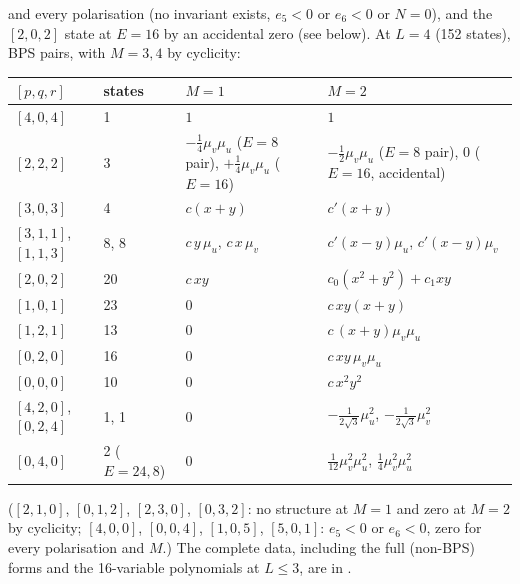 and every polarisation (no invariant exists, $e_5<0$ or $e_6<0$ or $N=0$), and the $[2,0,2]$ state at $E=16$ by an accidental zero (see below). At $L=4$ (152 states), BPS pairs, with $M=3,4$ by cyclicity:
\begin{center}\small
\begin{tabular}{@{}lp{1.2cm}p{4.6cm}p{5.4cm}@{}}
\toprule
$[p,q,r]$ & states & $M=1$ & $M=2$\\
\midrule
$[4,0,4]$ & 1 & $1$ & $1$\\
$[2,2,2]$ & 3 & $-\tfrac14\mu_v\mu_u$ ($E=8$ pair), $+\tfrac14\mu_v\mu_u$ ($E=16$) & $-\tfrac12\mu_v\mu_u$ ($E=8$ pair), $0$ ($E=16$, accidental)\\
$[3,0,3]$ & 4 & $c(x+y)$ & $c'(x+y)$\\
$[3,1,1]$, $[1,1,3]$ & 8, 8 & $c\,y\,\mu_u$, $c\,x\,\mu_v$ & $c'(x-y)\mu_u$, $c'(x-y)\mu_v$\\
$[2,0,2]$ & 20 & $c\,xy$ & $c_0(x^2+y^2)+c_1xy$\\
$[1,0,1]$ & 23 & 0 & $c\,xy(x+y)$\\
$[1,2,1]$ & 13 & 0 & $c\,(x+y)\mu_v\mu_u$\\
$[0,2,0]$ & 16 & 0 & $c\,xy\,\mu_v\mu_u$\\
$[0,0,0]$ & 10 & 0 & $c\,x^2y^2$\\
$[4,2,0]$, $[0,2,4]$ & 1, 1 & 0 & $-\tfrac1{2\sqrt3}\mu_u^2$, $-\tfrac1{2\sqrt3}\mu_v^2$\\
$[0,4,0]$ & 2 ($E=24,8$) & 0 & $\tfrac1{12}\mu_v^2\mu_u^2$, $\tfrac14\mu_v^2\mu_u^2$\\
\bottomrule
\end{tabular}
\end{center}
($[2,1,0]$, $[0,1,2]$, $[2,3,0]$, $[0,3,2]$: no structure at $M=1$ and zero at $M=2$ by cyclicity; $[4,0,0]$, $[0,0,4]$, $[1,0,5]$, $[5,0,1]$: $e_5<0$ or $e_6<0$, zero for every polarisation and $M$.) The complete data, including the full
(non-BPS) forms and the 16-variable polynomials at $L\le3$, are in .

